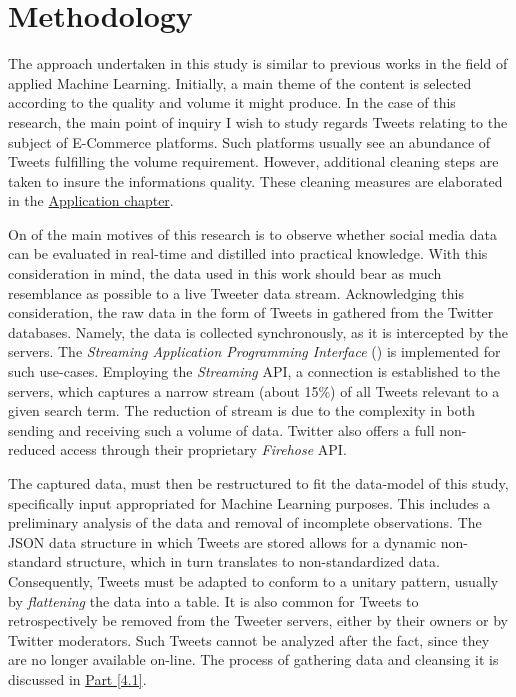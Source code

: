 \section{Methodology}
	The approach undertaken in this study is similar to previous works in the field of applied Machine Learning. Initially, a main theme of the content is selected according to the quality and volume it might produce. In the case of this research, the main point of inquiry I wish to study regards Tweets relating to the subject of E-Commerce platforms. Such platforms usually see an abundance of Tweets fulfilling the volume requirement. However, additional cleaning steps are taken to insure the informations quality. These cleaning measures are elaborated in the \hyperref[Application]{Application chapter}.
	
	\par
	
	On of the main motives of this research is to observe whether social media data can be evaluated in real-time and distilled into practical knowledge. With this consideration in mind, the data used in this work should bear as much resemblance as possible to a live Tweeter data stream. Acknowledging this consideration, the raw data in the form of Tweets in gathered from the Twitter databases. Namely, the data is collected synchronously, as it is intercepted by the servers. The \textit{Streaming Application Programming Interface} (\cite{stream_api}) is implemented for such use-cases. Employing the \textit{Streaming} API, a connection is established to the servers, which captures a narrow stream (about 15\%) of all Tweets relevant to a given search term. The reduction of stream is due to the complexity in both sending and receiving such a volume of data. Twitter also offers a full non-reduced access through their proprietary \textit{Firehose} API.
	
	\par
	
	The captured data, must then be restructured to fit the data-model of this study, specifically input appropriated for Machine Learning purposes. This includes a preliminary analysis of the data and removal of incomplete observations. The JSON data structure in which Tweets are stored allows for a dynamic non-standard structure, which in turn translates to non-standardized data. Consequently, Tweets must be adapted to conform to a unitary pattern, usually by \textit{flattening} the data into a table. It is also common for Tweets to retrospectively be removed from the Tweeter servers, either by their owners or by Twitter moderators. Such Tweets cannot be analyzed after the fact, since they are no longer available on-line. The process of gathering data and cleansing it is discussed in \hyperref[sec:collect_data]{Part [4.1]}.
	
